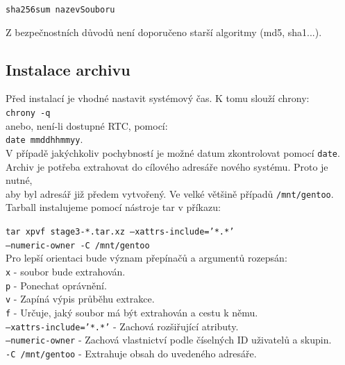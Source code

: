 \documentclass[12pt,a4paper,twoside,]{article}
\begin{document}
{{{{{{{\texttt{sha256sum nazevSouboru}

\hspace{-1.5em}Z bezpečnostních důvodů není doporučeno starší algoritmy (md5, sha1...).

\newpage
\subsection{\textsf{Instalace archivu}}
Před instalací je vhodné nastavit systémový čas. K tomu slouží chrony:\\
\hspace*{1.5em}\texttt{chrony -q}\\
 anebo, není-li dostupné RTC, pomocí: \\ \hspace*{1.5em}\texttt{date mmddhhmmyy}.\\
 
V případě jakýchkoliv pochybností je možné datum zkontrolovat pomocí \texttt{date}.
\\Archiv je potřeba extrahovat do cílového adresáře nového systému. Proto je nutné,\\
aby byl adresář již předem vytvořený. Ve velké většině případů \texttt{/mnt/gentoo}.\\
Tarball instalujeme pomocí nástroje tar v příkazu:

\texttt{tar xpvf stage3-*.tar.xz --xattrs-include='*.*' \\\hspace*{1.5em}--numeric-owner -C /mnt/gentoo}\\

\hspace{-1.5em}Pro lepší orientaci bude význam přepínačů a argumentů rozepsán:\\

\texttt{x} - soubor bude extrahován.\\
\hspace*{1.5em}\texttt{p} - Ponechat oprávnění. \\
\hspace*{1.5em}\texttt{v} - Zapíná výpis průběhu extrakce.\\
\hspace*{1.5em}\texttt{f} - Určuje, jaký soubor má být extrahován a cestu k němu.\\
\hspace*{1.5em}\texttt{--xattrs-include='*.*'} - Zachová rozšiřující atributy.\\
\hspace*{1.5em}\texttt{--numeric-owner} - Zachová vlastnictví podle číselných ID uživatelů a
skupin.\\
\hspace*{1.5em}\texttt{-C /mnt/gentoo} - Extrahuje obsah do uvedeného adresáře.\\



}}}}}}}
\end{document}
